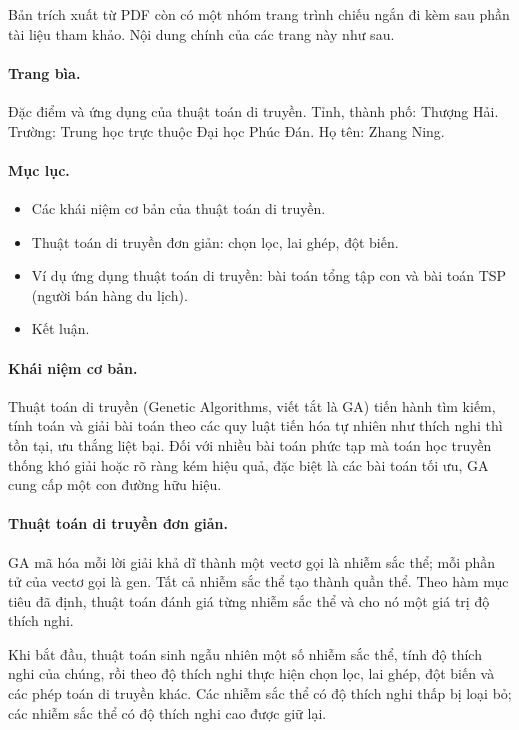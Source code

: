 \documentclass[11pt]{article}
\begin{document}
Bản trích xuất từ PDF còn có một nhóm trang trình chiếu ngắn đi kèm sau phần
tài liệu tham khảo. Nội dung chính của các trang này như sau.

\paragraph{Trang bìa.}
Đặc điểm và ứng dụng của thuật toán di truyền. Tỉnh, thành phố: Thượng Hải.
Trường: Trung học trực thuộc Đại học Phúc Đán. Họ tên: Zhang Ning.

\paragraph{Mục lục.}
\begin{itemize}
  \item Các khái niệm cơ bản của thuật toán di truyền.
  \item Thuật toán di truyền đơn giản: chọn lọc, lai ghép, đột biến.
  \item Ví dụ ứng dụng thuật toán di truyền: bài toán tổng tập con và bài
  toán TSP (người bán hàng du lịch).
  \item Kết luận.
\end{itemize}

\paragraph{Khái niệm cơ bản.}
Thuật toán di truyền (Genetic Algorithms, viết tắt là GA) tiến hành tìm
kiếm, tính toán và giải bài toán theo các quy luật tiến hóa tự nhiên như
thích nghi thì tồn tại, ưu thắng liệt bại. Đối với nhiều bài toán phức tạp mà
toán học truyền thống khó giải hoặc rõ ràng kém hiệu quả, đặc biệt là các bài
toán tối ưu, GA cung cấp một con đường hữu hiệu.

\paragraph{Thuật toán di truyền đơn giản.}
GA mã hóa mỗi lời giải khả dĩ thành một vectơ gọi là nhiễm sắc thể; mỗi phần
tử của vectơ gọi là gen. Tất cả nhiễm sắc thể tạo thành quần thể. Theo hàm
mục tiêu đã định, thuật toán đánh giá từng nhiễm sắc thể và cho nó một giá
trị độ thích nghi.

Khi bắt đầu, thuật toán sinh ngẫu nhiên một số nhiễm sắc thể, tính độ thích
nghi của chúng, rồi theo độ thích nghi thực hiện chọn lọc, lai ghép, đột biến
và các phép toán di truyền khác. Các nhiễm sắc thể có độ thích nghi thấp bị
loại bỏ; các nhiễm sắc thể có độ thích nghi cao được giữ lại.
\end{document}
